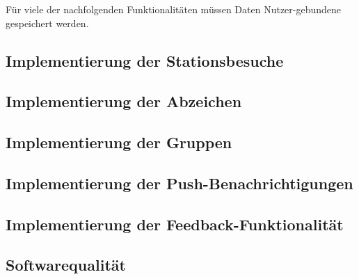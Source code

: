 Für viele der nachfolgenden Funktionalitäten müssen Daten Nutzer-gebundene
gespeichert werden.

\subsection{Implementierung der Stationsbesuche}

\subsection{Implementierung der Abzeichen}

\subsection{Implementierung der Gruppen}

\subsection{Implementierung der Push-Benachrichtigungen}

\subsection{Implementierung der Feedback-Funktionalität}

\subsection{Softwarequalität}









